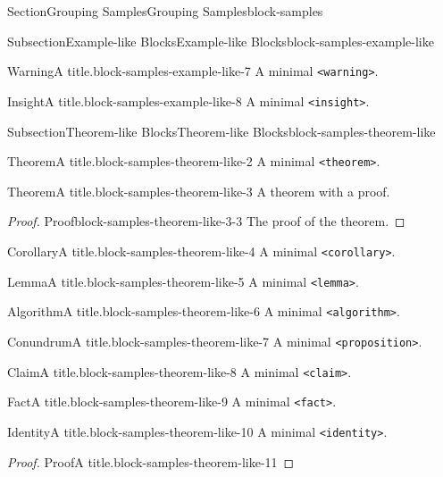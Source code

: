 \documentclass[twoside,10pt,]{article}
\newcommand{\mono}[1]{\texttt{#1}}
\numberwithin{equation}{section}
\begin{document}
\begin{sectionptx}{Section}{Grouping Samples}{}{Grouping Samples}{}{}{block-samples}
\begin{subsectionptx}{Subsection}{Example-like Blocks}{}{Example-like Blocks}{}{}{block-samples-example-like}
\begin{warning}{Warning}{A title.}{block-samples-example-like-7}
A minimal \mono{<warning>}.%
\end{warning}
\begin{insight}{Insight}{A title.}{block-samples-example-like-8}%
A minimal \mono{<insight>}.%
\end{insight}
\end{subsectionptx}
%
%
\typeout{************************************************}
\typeout{************************************************}
%
\begin{subsectionptx}{Subsection}{Theorem-like Blocks}{}{Theorem-like Blocks}{}{}{block-samples-theorem-like}
\begin{theorem}{Theorem}{A title.}{}{block-samples-theorem-like-2}%
A minimal \mono{<theorem>}.%
\end{theorem}
\begin{theorem}{Theorem}{A title.}{}{block-samples-theorem-like-3}%
A theorem with a proof.%
\end{theorem}
\begin{proof}{Proof}{}{block-samples-theorem-like-3-3}
The proof of the theorem.%
\end{proof}
\begin{corollary}{Corollary}{A title.}{}{block-samples-theorem-like-4}%
A minimal \mono{<corollary>}.%
\end{corollary}
\begin{lemma}{Lemma}{A title.}{}{block-samples-theorem-like-5}%
A minimal \mono{<lemma>}.%
\end{lemma}
\begin{algorithm}{Algorithm}{A title.}{}{block-samples-theorem-like-6}%
A minimal \mono{<algorithm>}.%
\end{algorithm}
\begin{proposition}{Conundrum}{A title.}{}{block-samples-theorem-like-7}%
A minimal \mono{<proposition>}.%
\end{proposition}
\begin{claim}{Claim}{A title.}{}{block-samples-theorem-like-8}%
A minimal \mono{<claim>}.%
\end{claim}
\begin{fact}{Fact}{A title.}{}{block-samples-theorem-like-9}%
A minimal \mono{<fact>}.%
\end{fact}
\begin{identity}{Identity}{A title.}{}{block-samples-theorem-like-10}%
A minimal \mono{<identity>}.%
\end{identity}
\begin{proof}{Proof}{A title.}{block-samples-theorem-like-11}

\end{proof}
\end{subsectionptx}
\end{sectionptx}
\end{document}

